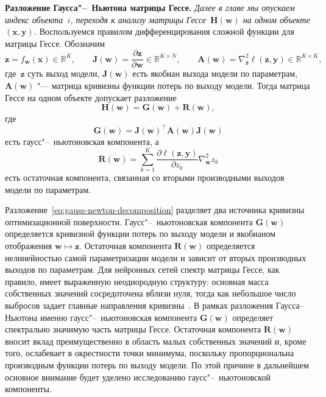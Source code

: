 \textbf{Разложение Гаусса"--~Ньютона матрицы Гессе.} \textit{Далее в главе мы опускаем индекс объекта~$i$, переходя к анализу матрицы Гессе~$\mathbf{H}(\mathbf{w})$ на одном объекте $(\mathbf{x}, \mathbf{y})$.} Воспользуемся правилом дифференцирования сложной функции для матрицы Гессе. Обозначим
\begin{equation}
    \label{eq:outputs-jacobian-curvature}
    \mathbf{z} = f_{\mathbf{w}}(\mathbf{x}) \in \mathbb{R}^{K},
    \qquad
    \mathbf{J}(\mathbf{w}) = \frac{\partial \mathbf{z}}{\partial \mathbf{w}} \in \mathbb{R}^{K \times N},
    \qquad
    \mathbf{A}(\mathbf{w}) = \nabla_{\mathbf{z}}^2 \ell(\mathbf{z}, \mathbf{y}) \in \mathbb{R}^{K \times K},
\end{equation}
где~$\mathbf{z}$ суть выход модели, $\mathbf{J}(\mathbf{w})$ есть якобиан выхода модели по параметрам, $\mathbf{A}(\mathbf{w})$ "--- матрица кривизны функции потерь по выходу модели. Тогда матрица Гессе на одном объекте допускает разложение
\begin{equation}
    \label{eq:gauss-newton-decomposition}
    \mathbf{H}(\mathbf{w})
    =
    \mathbf{G}(\mathbf{w})
    +
    \mathbf{R}(\mathbf{w}),
\end{equation}
где
\begin{equation}
    \label{eq:gauss-newton-term}
    \mathbf{G}(\mathbf{w})
    =
    \mathbf{J}(\mathbf{w})^\top
    \mathbf{A}(\mathbf{w})
    \mathbf{J}(\mathbf{w})
\end{equation}
есть гаусс"--~ньютоновская компонента, а
\begin{equation}
    \label{residual-term}
    \mathbf{R}(\mathbf{w})
    =
    \sum_{k=1}^K
    \frac{\partial \ell(\mathbf{z}, \mathbf{y})}{\partial z_{k}}
    \nabla_{\mathbf{w}}^2 z_{k}
\end{equation}
есть остаточная компонента, связанная со вторыми производными выходов модели по параметрам.

Разложение~\eqref{eq:gauss-newton-decomposition} разделяет два источника кривизны оптимизационной поверхности. Гаусс"--~ньютоновская компонента $\mathbf{G}(\mathbf{w})$ определяется кривизной функции потерь по выходу модели и якобианом отображения $\mathbf{w} \mapsto \mathbf{z}$. Остаточная компонента $\mathbf{R}(\mathbf{w})$ определяется нелинейностью самой параметризации модели и зависит от вторых производных выходов по параметрам. Для нейронных сетей спектр матрицы Гессе, как правило, имеет выраженную неоднородную структуру: основная масса собственных значений сосредоточена вблизи нуля, тогда как небольшое число выбросов задает главные направления кривизны~\cite{sagun2017hessian,ghorbani2019investigation,papyan2020traces,singh2021analytic}. В рамках разложения Гаусса--Ньютона именно гаусс"--~ньютоновская компонента $\mathbf{G}(\mathbf{w})$ определяет спектрально значимую часть матрицы Гессе. Остаточная компонента $\mathbf{R}(\mathbf{w})$ вносит вклад преимущественно в область малых собственных значений и, кроме того, ослабевает в окрестности точки минимума, поскольку пропорциональна производным функции потерь по выходу модели. По этой причине в дальнейшем основное внимание будет уделено исследованию гаусс"--~ньютоновской компоненты.


